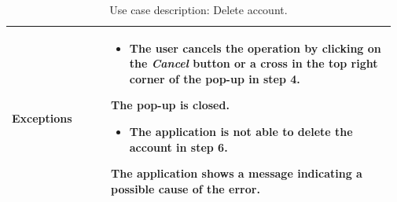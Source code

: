 \begin{table}[H]
\begin{tabular}{@{}p{0.25\linewidth} p{0.72\linewidth}@{}}
		\textbf{Exceptions}         & \begin{itemize}[leftmargin=.4cm,noitemsep,topsep=0pt,before=\vspace{-3mm}]
		   \item The user cancels the operation by clicking on the \textit{Cancel} button or a cross in the top right corner of the pop-up in step 4.
		\end{itemize}
		The pop-up is closed.
	    \begin{itemize}[leftmargin=.4cm,noitemsep,topsep=0pt]
		   \item The application is not able to delete the account in step 6.
		\end{itemize}
		The application shows a message indicating a possible cause of the error.
		\\\bottomrule
	\end{tabular}
	\caption{Use case description: Delete account.} 
\end{table}

